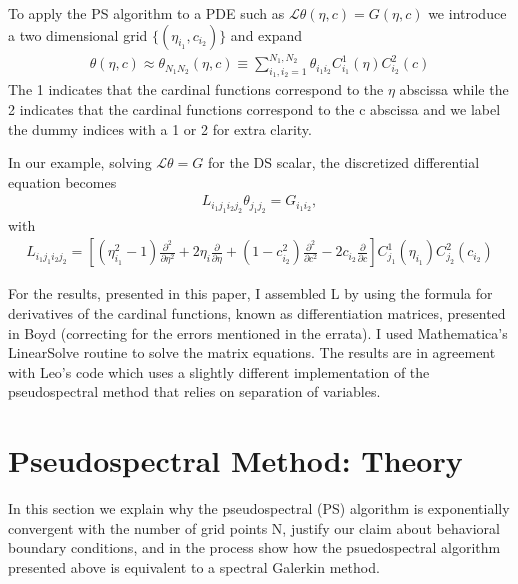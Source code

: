 \documentclass[aps,prd,amsmath,showpacs,amssymb,superscriptaddress,nofootinbib,longbibliography,eqsecnum,preprintnumbers]{revtex4-1}
\begin{document}

To apply the PS algorithm to a PDE such as $\mathcal L \theta(\eta,c)=G(\eta,c)$ we introduce a two dimensional grid $\{(\eta_{i_1}, c_{i_2})\}$ and expand
\begin{align}
\theta(\eta, c) \approx \theta_{N_1N_2}(\eta,c) \equiv \sum_{i_1, i_2 =1}^{N_1,N_2} \theta_{i_1i_2}C^1_{i_1}(\eta)C^2_{i_2}(c)
\end{align}
The 1 indicates that the cardinal functions correspond to the $\eta$ abscissa while the 2 indicates that the cardinal functions correspond to the c abscissa and we label the dummy indices with a 1 or 2 for extra clarity.

In our example, solving $\mathcal L\theta=G$ for the DS scalar,
the discretized differential equation becomes
\begin{align}
L_{i_1j_1i_2j_2}\theta_{j_1j_2}=G_{i_1i_2}, \label{eq:L4}
\end{align}
with 
\begin{align}
L_{i_1j_1i_2j_2}=\left[(\eta_{i_1}^2-1)\frac{\partial^2}{\partial \eta^2}+2\eta_i \frac{\partial}{\partial \eta}+(1-c_{i_2}^2)\frac{\partial^2}{\partial c^2}-2c_{i_2}\frac{\partial }{\partial c}\right]C^1_{j_1}(\eta_{i_1})C^2_{j_2}(c_{i_2})
\end{align}

For the results, presented in this paper, I assembled L by using the formula for derivatives of the cardinal functions, known as differentiation matrices, presented in Boyd \cite{Boyd99chebyshevand} (correcting for the errors mentioned in the errata). I used Mathematica's LinearSolve routine to solve the matrix equations. The results are in agreement with Leo's code which uses a slightly different implementation of the pseudospectral method that relies on separation of variables.

\section{Pseudospectral Method: Theory}
In this section we explain why the pseudospectral (PS) algorithm is exponentially convergent with the number of grid points N, justify our claim about behavioral boundary conditions, and in the process show how the psuedospectral algorithm presented above is equivalent to a spectral Galerkin method.
\end{document}
